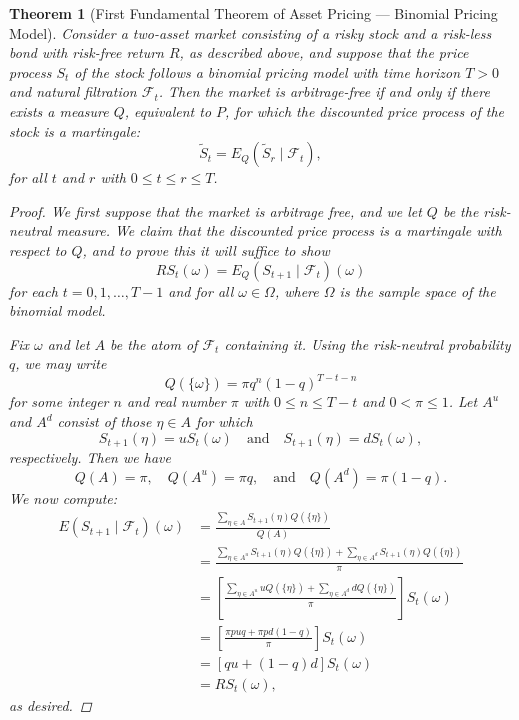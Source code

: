 \documentclass[reqno]{amsart}
\newtheorem{thm}{Theorem}[section]
\theoremstyle{definition}
\numberwithin{equation}{section}
\begin{document}
\begin{thm}[First Fundamental Theorem of Asset Pricing --- Binomial Pricing Model]
Consider a two-asset market consisting of a risky stock and a risk-less bond with risk-free return $R$, as described above, and suppose that the price process $S_t$ of the stock follows a binomial pricing model with time horizon $T>0$ and natural filtration $\mathcal{F}_t$. Then the market is arbitrage-free if and only if there exists a measure $Q$, equivalent to $P$, for which the discounted price process of the stock is a martingale:
	\[
	\tilde{S}_t = E_Q ( \tilde{S}_r\mid \mathcal{F}_t),
	\]
for all $t$ and $r$ with $0 \leq t \leq r\leq T$.
\begin{proof}
We first suppose that the market is arbitrage free, and we let $Q$ be the risk-neutral measure. We claim that the discounted price process is a martingale with respect to $Q$, and to prove this it will suffice to show
	\[
	RS_t(\omega) = E_Q\left(S_{t+1} \mid \mathcal{F}_t \right)(\omega)
	\]
for each $t=0,1,\ldots,T-1$ and for all $\omega\in \Omega$, where $\Omega$ is the sample space of the binomial model.

Fix $\omega$ and let $A$ be the atom of $\mathcal{F}_t$ containing it. Using the risk-neutral probability $q$, we may write
	\[
	Q(\{\omega\}) = \pi q^n (1-q)^{T-t-n}
	\]
for some integer $n$ and real number $\pi$ with $0\leq n \leq T-t$ and $0 < \pi \leq 1$. Let $A^u$ and $A^d$ consist of those $\eta \in A$ for which
	\[S_{t+1}(\eta) = uS_t(\omega) \quad \text{and} \quad S_{t+1}(\eta) = d S_t(\omega),
	\]
respectively. Then we have
	\[
	Q(A) = \pi, \quad Q(A^u) = \pi q, \quad \text{and} \quad Q(A^d) = \pi (1-q).
	\]
We now compute:
	\begin{align*}
	E\left(S_{t+1} \mid \mathcal{F}_t \right)(\omega) &= \frac{\sum_{\eta\in A} S_{t+1}(\eta)Q(\{\eta\})}{Q(A)} \\
	&= \frac{\sum_{\eta\in A^u} S_{t+1}(\eta)Q(\{\eta\}) + \sum_{\eta\in A^d} S_{t+1}(\eta)Q(\{\eta\})}{\pi} \\
	&= \left[ \frac{\sum_{\eta\in A^u} uQ(\{\eta\}) + \sum_{\eta\in A^d} dQ(\{\eta\})}{\pi} \right]S_t(\omega) \\
	&= \left[ \frac{\pi puq + \pi pd(1-q)}{\pi} \right]S_t(\omega) \\
	&= \left[ qu + (1-q)d\right]S_t(\omega) \\
	&= R S_t(\omega),
	\end{align*}
as desired.


\end{proof}
\end{thm}
\end{document}
